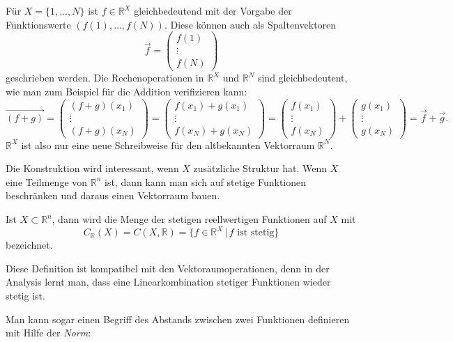 \begin{beispiel}
Für $X=\{1,\dots,N\}$ ist $f\in \mathbb R^X$ gleichbedeutend mit
der Vorgabe der Funktionswerte $(f(1),\dots,f(N))$.
Diese können auch als Spaltenvektoren
\[
\vec{f} = \begin{pmatrix}f(1)\\\vdots\\f(N)\end{pmatrix}
\]
geschrieben werden.
Die Rechenoperationen in $\mathbb R^X$ und $\mathbb R^N$ sind gleichbedeutent,
wie man zum Beispiel für die Addition verifizieren kann:
\[
\overrightarrow{(f+g)}
=
\begin{pmatrix}
(f+g)(x_1)\\\vdots\\(f+g)(x_N)
\end{pmatrix}
=
\begin{pmatrix}
f(x_1)+g(x_1)\\\vdots\\f(x_N)+g(x_N)
\end{pmatrix}
=
\begin{pmatrix}
f(x_1)\\\vdots\\f(x_N)
\end{pmatrix}
+
\begin{pmatrix}
g(x_1)\\\vdots\\g(x_N)
\end{pmatrix}
=
\vec{f} + \vec{g}.
\]
$\mathbb R^X$ ist also nur eine neue Schreibweise für den altbekannten
Vektorraum $\mathbb R^N$.
\end{beispiel}

Die Konstruktion wird interessant, wenn $X$ zusätzliche Struktur hat.
Wenn $X$ eine Teilmenge von $\mathbb R^n$ ist, dann kann man sich auf
stetige Funktionen beschränken und daraus einen Vektorraum bauen.

\begin{definition}
Ist $X\subset\mathbb R^n$, dann wird die Menge der stetigen reellwertigen
%
%
Funktionen auf $X$ mit
\[
C_{\mathbb R}(X)
=
C(X,\mathbb R)
=
\{ f\in \mathbb R^X\,|\,\text{$f$ ist stetig}\}
\]
bezeichnet.
\end{definition}

Diese Definition ist kompatibel mit den Vektoraumoperationen,
denn in der Analysis lernt man, dass eine Linearkombination
stetiger Funktionen wieder stetig ist.

Man kann sogar einen Begriff des Abstands zwischen zwei Funktionen
definieren mit Hilfe der {\em Norm}:

